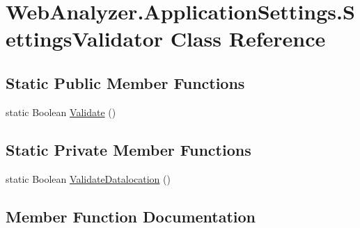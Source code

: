 \hypertarget{class_web_analyzer_1_1_application_settings_1_1_settings_validator}{}\section{Web\+Analyzer.\+Application\+Settings.\+Settings\+Validator Class Reference}
\label{class_web_analyzer_1_1_application_settings_1_1_settings_validator}
\subsection*{Static Public Member Functions}
\begin{DoxyCompactItemize}
\item 
static Boolean \hyperlink{class_web_analyzer_1_1_application_settings_1_1_settings_validator_ad9d6638c1a3ebb0b123d6fae005c657a}{Validate} ()
\end{DoxyCompactItemize}
\subsection*{Static Private Member Functions}
\begin{DoxyCompactItemize}
\item 
static Boolean \hyperlink{class_web_analyzer_1_1_application_settings_1_1_settings_validator_a734f765786368247956035a592805156}{Validate\+Datalocation} ()
\end{DoxyCompactItemize}


\subsection{Member Function Documentation}
\hypertarget{class_web_analyzer_1_1_application_settings_1_1_settings_validator_ad9d6638c1a3ebb0b123d6fae005c657a}{}
